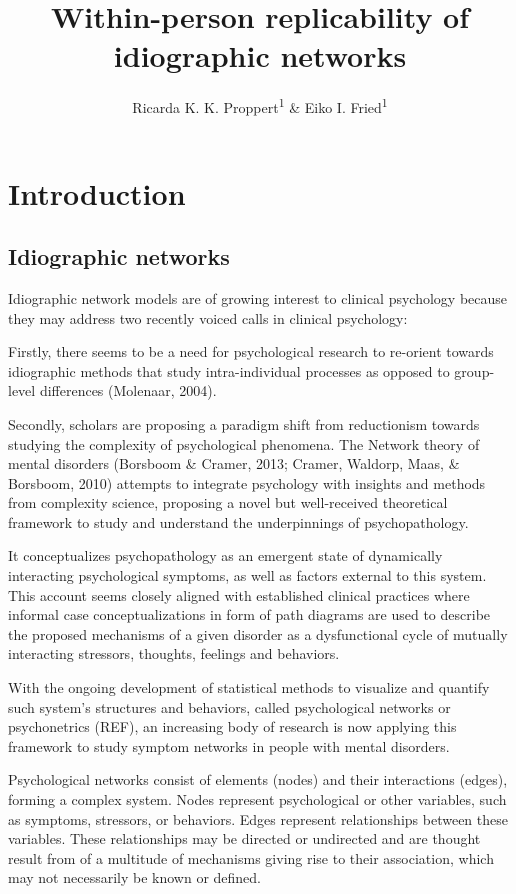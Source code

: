 \documentclass[
  english,
  man]{apa6}
\title{Within-person replicability of idiographic networks}
\author{Ricarda K. K. Proppert\textsuperscript{1} \& Eiko I. Fried\textsuperscript{1}}
\date{}
\affiliation{\vspace{0.5cm}\textsuperscript{1} Clinical Psychology, Leiden University, The Netherlands}
\begin{document}
\maketitle

\hypertarget{introduction}{%
\section{Introduction}\label{introduction}}

\hypertarget{idiographic-networks}{%
\subsection{Idiographic networks}\label{idiographic-networks}}

Idiographic network models are of growing interest to clinical psychology because they may address two recently voiced calls in clinical psychology:

Firstly, there seems to be a need for psychological research to re-orient towards idiographic methods that study intra-individual processes as opposed to group-level differences (Molenaar, 2004).

Secondly, scholars are proposing a paradigm shift from reductionism towards studying the complexity of psychological phenomena. The Network theory of mental disorders (Borsboom \& Cramer, 2013; Cramer, Waldorp, Maas, \& Borsboom, 2010) attempts to integrate psychology with insights and methods from complexity science, proposing a novel but well-received theoretical framework to study and understand the underpinnings of psychopathology.

It conceptualizes psychopathology as an emergent state of dynamically interacting psychological symptoms, as well as factors external to this system. This account seems closely aligned with established clinical practices where informal case conceptualizations in form of path diagrams are used to describe the proposed mechanisms of a given disorder as a dysfunctional cycle of mutually interacting stressors, thoughts, feelings and behaviors.

With the ongoing development of statistical methods to visualize and quantify such system's structures and behaviors, called psychological networks or psychonetrics (REF), an increasing body of research is now applying this framework to study symptom networks in people with mental disorders.

Psychological networks consist of elements (nodes) and their interactions (edges), forming a complex system. Nodes represent psychological or other variables, such as symptoms, stressors, or behaviors. Edges represent relationships between these variables. These relationships may be directed or undirected and are thought result from of a multitude of mechanisms giving rise to their association, which may not necessarily be known or defined.
\end{document}
